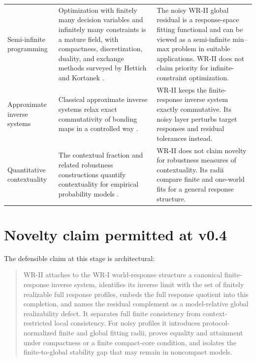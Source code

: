\documentclass[11pt]{article}
\begin{document}
\begin{longtable}{>{\raggedright\arraybackslash}p{}
                  >{\raggedright\arraybackslash}p{}
                  >{\raggedright\arraybackslash}p{}}
Semi-infinite programming &
Optimization with finitely many decision variables and infinitely many
constraints is a mature field, with compactness, discretization, duality, and
exchange methods surveyed by Hettich and Kortanek
\cite{HettichKortanek1993}. &
The noisy WR-II global residual is a response-space fitting functional and can
be viewed as a semi-infinite min--max problem in suitable applications. WR-II
does not claim priority for infinite-constraint optimization. \\[5pt]

Approximate inverse systems &
Classical approximate inverse systems relax exact commutativity of bonding maps
in a controlled way \cite{MardesicRubin1989,MardesicSegal1989}. &
WR-II keeps the finite-response inverse system exactly commutative. Its noisy
layer perturbs target responses and residual tolerances instead. \\[5pt]

Quantitative contextuality &
The contextual fraction and related robustness constructions quantify
contextuality for empirical probability models
\cite{AbramskyBarbosaMansfield2017}. &
WR-II does not claim novelty for robustness measures of contextuality. Its
radii compare finite and one-world fits for a general response structure. \\
\bottomrule
\end{longtable}

\section{Novelty claim permitted at v0.4}

The defensible claim at this stage is architectural:

\begin{quote}
WR-II attaches to the WR-I world-response structure a canonical finite-response
inverse system, identifies its inverse limit with the set of finitely realizable
full response profiles, embeds the full response quotient into this completion,
and names the residual complement as a model-relative global realizability
defect. It separates full finite consistency from context-restricted local
consistency. For noisy profiles it introduces protocol-normalized finite and
global fitting radii, proves equality and attainment under compactness or a
finite compact-core condition, and isolates the finite-to-global stability gap
that may remain in noncompact models.
\end{quote}
\end{document}
